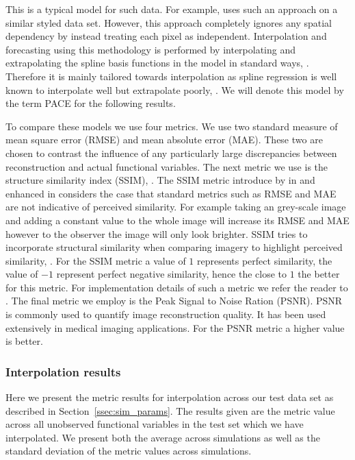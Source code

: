 This is a typical model for such data.
For example, \cite{hooker_maximal_2016} uses such an approach on a similar styled data set. 
However, this approach completely ignores any spatial dependency by instead treating each pixel as independent.
Interpolation and forecasting using this methodology is performed by interpolating and extrapolating the spline basis functions in the model in standard ways, \citep{de_boor_practical_2001}.
Therefore it is mainly tailored towards interpolation as spline regression is well known to interpolate well but extrapolate poorly, \citep{de_boor_practical_2001}.
We will denote this model by the term PACE for the following results. 


To compare these models we use four metrics. 
We use two standard measure of mean square error (RMSE) and mean absolute error (MAE).
These two are chosen to contrast the influence of any particularly large discrepancies between reconstruction and actual functional variables. 
The next metric we use is the structure similarity index (SSIM), \citep{wang_image_2004}.
The SSIM metric introduce by \citeauthor{wang_image_2004} in \citeyear{wang_image_2004} and enhanced in \citeyear{wang_mean_2009} considers the case that standard metrics such as RMSE and MAE are not indicative of perceived similarity.
For example taking an grey-scale image and adding a constant value to the whole image will increase its RMSE and MAE however to the observer the image will only look brighter. 
SSIM tries to incorporate structural similarity when comparing imagery to highlight perceived similarity, \citep{wang_mean_2009}. 
For the SSIM metric a value of $1$ represents perfect similarity, the value of $-1$ represent perfect negative similarity, hence the close to $1$ the better for this metric.
For implementation details of such a metric we refer the reader to \citep{wang_mean_2009}. 
The final metric we employ is the Peak Signal to Noise Ration (PSNR). 
PSNR is commonly used to quantify image reconstruction quality. 
It has been used extensively in medical imaging applications.
For the PSNR metric a higher value is better. 

\subsubsection{Interpolation results}
Here we present the metric results for interpolation across our test data set as described in Section~\ref{ssec:sim_params}.
The results given are the metric value across all unobserved functional variables in the test set which we have interpolated.
We present both the average across simulations as well as the standard deviation of the metric values across simulations.

